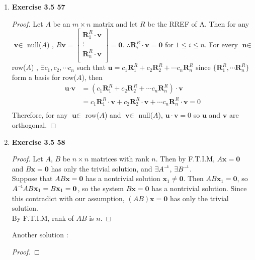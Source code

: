 \begin{enumerate}
	\item \textbf{Exercise 3.5 57}
	\begin{proof}
		Let $ A $ be an $ m\times n $ matrix and let $ R $ be the RREF of A. Then for any $ \textbf{v} \in $ null($A$) , 
		$ R\textbf{v} = \begin{bmatrix}
		\textbf{R}^R_1 \cdot\textbf{v} \\
		\vdots \\
		\textbf{R}^R_n \cdot\textbf{v} \\
		\end{bmatrix} = \textbf{0}$. $ \therefore \textbf{R}^R_i\cdot\textbf{v}=\textbf{0} $ for $ 1\leq i \leq n $.
		For every $ \textbf{n} \in $ row($A$) , $ \exists c_1,c_2, \cdots c_n $ such that $ \textbf{u}=c_1\textbf{R}^R_1 + c_2\textbf{R}^R_2 + \cdots c_n\textbf{R}^R_n $ 
		since $ \{\textbf{R}^R_1, \cdots \textbf{R}^R_n \} $ form a basis for row($A$), 
		then 
		\begin{align*}
		\textbf{u}\cdot\textbf{v} &= \left(c_1\textbf{R}^R_1 + c_2\textbf{R}^R_2 + \cdots c_n\textbf{R}^R_n\right)\cdot \textbf{v}  \\
		&= c_1\textbf{R}^R_1\cdot\textbf{v} + c_2\textbf{R}^R_2\cdot\textbf{v} + \cdots c_n\textbf{R}^R_n\cdot\textbf{v} = 0\\
		\end{align*}
		Therefore, for any $ \textbf{u} \in $ row($A$) and $ \textbf{v} \in $ null($A$), $ \textbf{u}\cdot \textbf{v}=0 $ so $ \textbf{u} $ and $ \textbf{v} $ are orthogonal.
	\end{proof}
	\item \textbf{Exercise 3.5 58}
	\begin{proof}
		Let $A$, $ B $ be $ n\times n $ matrices with rank $ n $.
		Then by F.T.I.M, $ A\textbf{x}=\textbf{0} $ and $ B\textbf{x}=\textbf{0} $ has only the trivial solution, and $ \exists \inv{A} $, $ \exists \inv{B} $. \\
		Suppose that $ AB\textbf{x}=\textbf{0} $ has a nontrivial solution $ \textbf{x}_1\neq \textbf{0} $. Then $ AB\textbf{x}_1=\textbf{0} $, so $ \inv{A}AB\textbf{x}_1=B\textbf{x}_1=\textbf{0} $, so the system $ B\textbf{x}=\textbf{0} $ has a nontrivial solution. Since this contradict with our assumption, $ (AB)\textbf{x}=\textbf{0} $ has only the trivial solution. \\
		By F.T.I.M, rank of $ AB $ is $ n $.
	\end{proof}
	Another solution : 
	\begin{proof}

\end{proof}
\end{enumerate}
